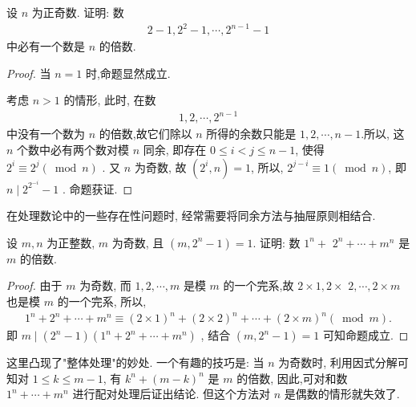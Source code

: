 \begin{example}
	设 $n$ 为正奇数. 证明: 数
	\begin{align*}
		2-1,2^{2}-1, \cdots, 2^{n-1}-1
	\end{align*}
	中必有一个数是 $n$ 的倍数.
\end{example}
\begin{proof}
	当 $n=1$ 时,命题显然成立.

	考虑 $n>1$ 的情形, 此时, 在数
	\begin{align*}
		1,2, \cdots, 2^{n-1}
	\end{align*}
	中没有一个数为 $n$ 的倍数,故它们除以 $n$ 所得的余数只能是 $1,2, \cdots, n-1$.所以, 这 $n$ 个数中必有两个数对模 $n$ 同余, 即存在 $0 \leqslant i<j \leqslant n-1$, 使得 $2^{i} \equiv 2^{j}(\bmod n)$ . 又 $n$ 为奇数, 故 $\left(2^{i}, n\right)=1$, 所以, $2^{j-i} \equiv 1(\bmod n)$, 即 $n \mid 2^{2^{-i}}-1$ . 命题获证.
\end{proof}
\begin{note}
	在处理数论中的一些存在性问题时, 经常需要将同余方法与抽屉原则相结合.
\end{note}

\begin{example}
	设 $m ,  n$ 为正整数, $m$ 为奇数, 且 $\left(m, 2^{n}-1\right)=1$. 证明: 数 $1^{n}+$ $2^{n}+\cdots+m^{n}$ 是 $m$ 的倍数.
\end{example}
\begin{proof}
	由于 $m$ 为奇数, 而 $1,2, \cdots, m$ 是模 $m$ 的一个完系,故 $2 \times 1,2 \times$ $2, \cdots, 2 \times m$ 也是模 $m$ 的一个完系, 所以,
	\begin{align*}
		1^{n}+2^{n}+\boldsymbol{\cdots}+m^{n} \equiv(2 \times 1)^{n}+(2 \times 2)^{n}+\boldsymbol{\cdots}+(2 \times m)^{n}(\bmod m) .
	\end{align*}
	即 $m \mid\left(2^{n}-1\right)\left(1^{n}+2^{n}+\cdots+m^{n}\right)$ , 结合 $\left(m, 2^{n}-1\right)=1$ 可知命题成立.
\end{proof}
\begin{note}
	这里凸现了"整体处理"的妙处. 一个有趣的技巧是: 当 $n$ 为奇数时, 利用因式分解可知对 $1 \leqslant k \leqslant m-1$, 有 $k^{n}+(m-k)^{n}$ 是 $m$ 的倍数, 因此,可对和数 $1^{n}+\cdots+m^{n}$ 进行配对处理后证出结论. 但这个方法对 $n$ 是偶数的情形就失效了.
\end{note}

